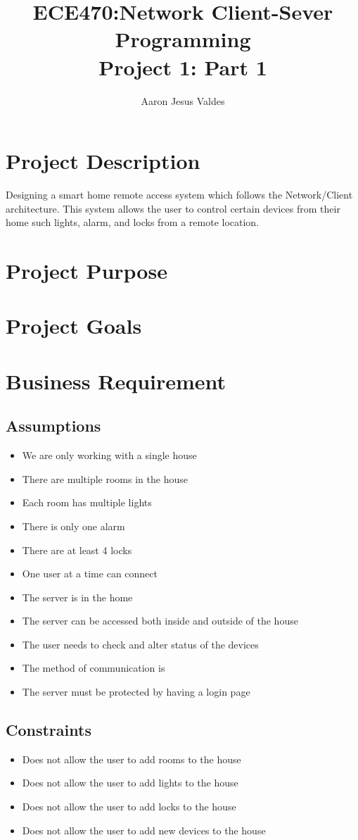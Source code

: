 \documentclass[11pt]{article}
\title{\Huge{ECE470:Network Client-Sever Programming}\\\LARGE{Project 1: Part 1}}
\author{Aaron Jesus Valdes}
\begin{document}
	\maketitle
	\clearpage
	\tableofcontents
	\onehalfspacing
	\clearpage
	\section{Project Description}
	Designing a smart home remote access system which follows the Network/Client architecture. This system allows the user to control certain devices from their home such lights, alarm, and locks from a remote location.
	\section{Project Purpose}
	\section{Project Goals}
	\section{Business Requirement}
		\subsection{Assumptions}
			\begin{itemize}
				\item We are only working with a single house
				\item There are multiple rooms in the house
				\item Each room has multiple lights
				\item There is only one alarm
				\item There are at least 4 locks
				\item One user at a time can connect
				\item The server is in the home
				\item The server can be accessed both inside and outside of the house
				\item The user needs to check and alter status of the devices
				\item The method of communication is
				\item The server must be protected by having a login page
			\end{itemize}
		\subsection{Constraints}
			\begin{itemize}
				\item Does not allow the user to add rooms to the house
				\item Does not allow the user to add lights to the house
				\item Does not allow the user to add locks to the house
				\item Does not allow the user to add new devices to the house
			\end{itemize}
\end{document}
